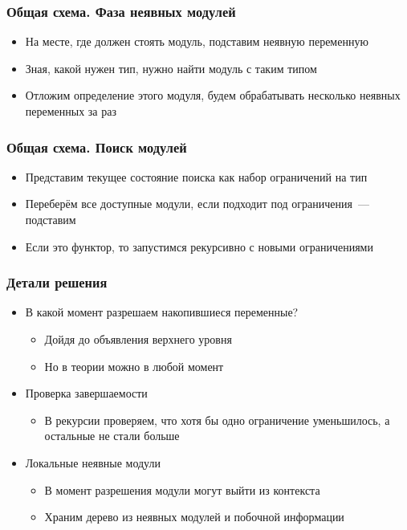 \documentclass{beamer}
\begin{document}
\begin{frame}\frametitle{Общая схема. Фаза неявных модулей}
\begin{itemize}
  \item На месте, где должен стоять модуль, подставим неявную переменную
  \item Зная, какой нужен тип, нужно найти модуль с таким типом
  \item Отложим определение этого модуля, будем обрабатывать несколько неявных переменных за раз
\end{itemize}
\end{frame}

\begin{frame}\frametitle{Общая схема. Поиск модулей}
\begin{itemize}
  \item Представим текущее состояние поиска как набор ограничений на тип
  \item Переберём все доступные модули, если подходит под ограничения~--- подставим
  \item Если это функтор, то запустимся рекурсивно с новыми ограничениями
\end{itemize}
\end{frame}

\lstset{language=caml}
\begin{frame}[fragile]\frametitle{Детали решения}
\begin{itemize}
  \item В какой момент разрешаем накопившиеся переменные?
  \begin{itemize}
    \item Дойдя до объявления верхнего уровня
    \item Но в теории можно в любой момент
  \end{itemize}
  \item Проверка завершаемости
  \begin{itemize}
    \item В рекурсии проверяем, что хотя бы одно ограничение уменьшилось, а остальные не стали больше
  \end{itemize}
  \item Локальные неявные модули
  \begin{itemize}
    \item В момент разрешения модули могут выйти из контекста
    \item Храним дерево из неявных модулей и побочной информации
  \end{itemize}
\end{itemize}
\end{frame}
\end{document}
